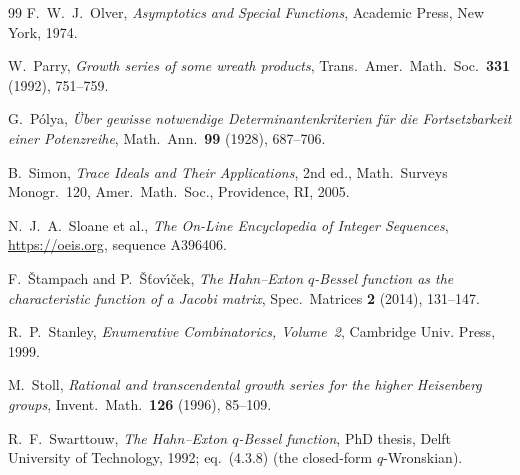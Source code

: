 \documentclass[11pt]{article}
\theoremstyle{plain}
\theoremstyle{definition}
\theoremstyle{remark}
\theoremstyle{plain}\newtheorem*{maintheorem}{Main Theorem}
\begin{document}
\begin{thebibliography}{99}
 F.~W.~J.~Olver, \emph{Asymptotics and Special Functions}, Academic Press,
New York, 1974.

 W.~Parry, \emph{Growth series of some wreath products}, Trans.\ Amer.\ Math.\
Soc.\ \textbf{331} (1992), 751--759.

 G.~P\'olya, \emph{\"Uber gewisse notwendige Determinantenkriterien f\"ur die
Fortsetzbarkeit einer Potenzreihe}, Math.\ Ann.\ \textbf{99} (1928), 687--706.

 B.~Simon, \emph{Trace Ideals and Their Applications}, 2nd ed., Math.\ Surveys
Monogr.~120, Amer.\ Math.\ Soc., Providence, RI, 2005.

 N.~J.~A.~Sloane et al., \emph{The On-Line Encyclopedia of Integer Sequences},
\url{https://oeis.org}, sequence A396406.

 F.~\v{S}tampach and P.~\v{S}\v{t}ov\'{\i}\v{c}ek, \emph{The
Hahn--Exton $q$-Bessel function as the characteristic function of a Jacobi matrix}, Spec.\
Matrices \textbf{2} (2014), 131--147.

 R.~P.~Stanley, \emph{Enumerative Combinatorics, Volume~2}, Cambridge Univ.
Press, 1999.

 M.~Stoll, \emph{Rational and transcendental growth series for the higher
Heisenberg groups}, Invent.\ Math.\ \textbf{126} (1996), 85--109.

\bibitem{Swarttouw1992} R.~F.~Swarttouw, \emph{The Hahn--Exton $q$-Bessel function}, PhD thesis,
Delft University of Technology, 1992; eq.~(4.3.8) (the closed-form $q$-Wronskian).

\end{thebibliography}
\end{document}
